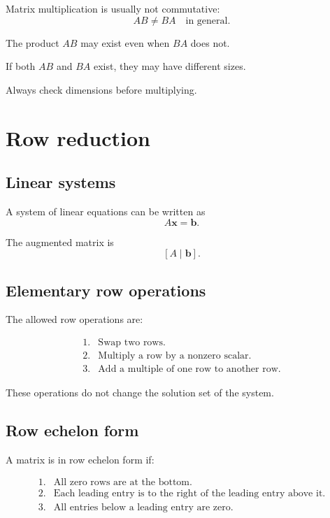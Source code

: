 Matrix multiplication is usually not commutative:
\[
\boxed{
    AB\ne BA
    \quad\text{in general}.
}
\]

The product \(AB\) may exist even when \(BA\) does not.

If both \(AB\) and \(BA\) exist, they may have different sizes.

Always check dimensions before multiplying.

\section{Row reduction}
\label{app:C.2}

\subsection*{Linear systems}

A system of linear equations can be written as
\[
\boxed{
    A\mathbf x=\mathbf b.
}
\]

The augmented matrix is
\[
\boxed{
    [A\mid \mathbf b].
}
\]

\subsection*{Elementary row operations}

The allowed row operations are:

\[
\begin{array}{ll}
1. & \text{Swap two rows.}\\[1mm]
2. & \text{Multiply a row by a nonzero scalar.}\\[1mm]
3. & \text{Add a multiple of one row to another row.}
\end{array}
\]

These operations do not change the solution set of the system.

\subsection*{Row echelon form}

A matrix is in row echelon form if:

\[
\begin{array}{ll}
1. & \text{All zero rows are at the bottom.}\\[1mm]
2. & \text{Each leading entry is to the right of the leading entry above it.}\\[1mm]
3. & \text{All entries below a leading entry are zero.}
\end{array}
\]

